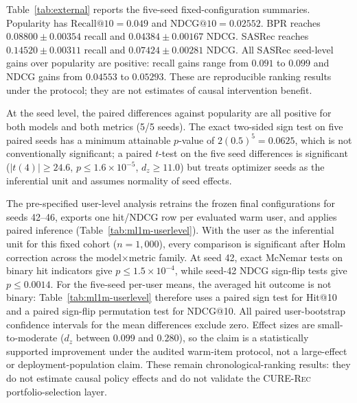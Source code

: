 \documentclass[review]{elsarticle}
\makeatletter
\theoremstyle{plain}
\theoremstyle{definition}
\theoremstyle{remark}
\newcommand{\NDCG}{\mathrm{NDCG@10}}
\newcommand{\Recall}{\mathrm{Recall@10}}
\newcommand{\CURE}{\textsc{CURE-Rec}}
\makeatother
\begin{document}
Table~\ref{tab:external} reports the five-seed fixed-configuration summaries. Popularity has $\Recall=0.049$ and $\NDCG=0.02552$. BPR reaches $0.08800\pm0.00354$ recall and $0.04384\pm0.00167$ NDCG. SASRec reaches $0.14520\pm0.00311$ recall and $0.07424\pm0.00281$ NDCG. All SASRec seed-level gains over popularity are positive: recall gains range from $0.091$ to $0.099$ and NDCG gains from $0.04553$ to $0.05293$. These are reproducible ranking results under the protocol; they are not estimates of causal intervention benefit.

At the seed level, the paired differences against popularity are all positive for both models and both metrics (5/5 seeds). The exact two-sided sign test on five paired seeds has a minimum attainable $p$-value of $2(0.5)^5=0.0625$, which is not conventionally significant; a paired $t$-test on the five seed differences is significant ($|t(4)|\geq24.6$, $p\leq1.6\times10^{-5}$, $d_z\geq11.0$) but treats optimizer seeds as the inferential unit and assumes normality of seed effects.

The pre-specified user-level analysis retrains the frozen final configurations for seeds 42--46, exports one hit/NDCG row per evaluated warm user, and applies paired inference (Table~\ref{tab:ml1m-userlevel}). With the user as the inferential unit for this fixed cohort ($n=1{,}000$), every comparison is significant after Holm correction across the model$\times$metric family. At seed 42, exact McNemar tests on binary hit indicators give $p\leq1.5\times10^{-4}$, while seed-42 NDCG sign-flip tests give $p\leq0.0014$. For the five-seed per-user means, the averaged hit outcome is not binary: Table~\ref{tab:ml1m-userlevel} therefore uses a paired sign test for Hit@10 and a paired sign-flip permutation test for NDCG@10. All paired user-bootstrap confidence intervals for the mean differences exclude zero. Effect sizes are small-to-moderate ($d_z$ between $0.099$ and $0.280$), so the claim is a statistically supported improvement under the audited warm-item protocol, not a large-effect or deployment-population claim. These remain chronological-ranking results: they do not estimate causal policy effects and do not validate the \CURE{} portfolio-selection layer.
\end{document}

